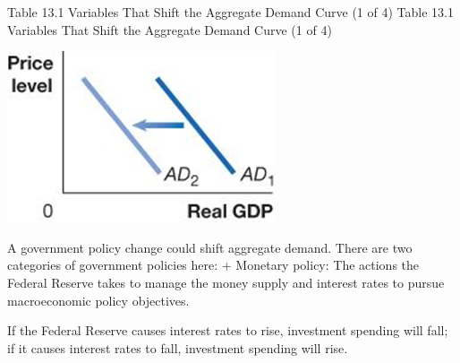 \documentclass[
  12pt,
  ignorenonframetext,
]{beamer}
\begin{document}
\begin{frame}{Table 13.1 Variables That Shift the Aggregate Demand Curve
(1 of 4)}
\protect\hypertarget{table-13.1-variables-that-shift-the-aggregate-demand-curve-1-of-4}{}
Table 13.1 Variables That Shift the Aggregate Demand Curve (1 of 4)

\includegraphics[width=\textwidth,height=0.99\textheight]{imgs3/img_slide13a.png}

A government policy change could shift aggregate demand. There are two
categories of government policies here: + Monetary policy: The actions
the Federal Reserve takes to manage the money supply and interest rates
to pursue macroeconomic policy objectives.

If the Federal Reserve causes interest rates to rise, investment
spending will fall; if it causes interest rates to fall, investment
spending will rise.
\end{frame}
\end{document}
